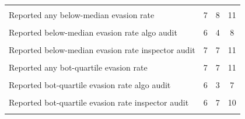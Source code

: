 {\begin{tabular}{l*{3}{c}}
            &                     &                     &                     \\
Reported any below-median evasion rate&           7         &           8         &          11         \\
            &                     &                     &                     \\
Reported below-median evasion rate algo audit&           6         &           4         &           8         \\
            &                     &                     &                     \\
Reported below-median evasion rate  inspector audit&           7         &           7         &          11         \\
            &                     &                     &                     \\
Reported any bot-quartile evasion rate&           7         &           7         &          11         \\
            &                     &                     &                     \\
Reported bot-quartile  evasion rate algo audit&           6         &           3         &           7         \\
            &                     &                     &                     \\
Reported bot-quartile  evasion rate  inspector audit&           6         &           7         &          10         \\
            &                     &                     &                     \\
\bottomrule
\end{tabular}
}
